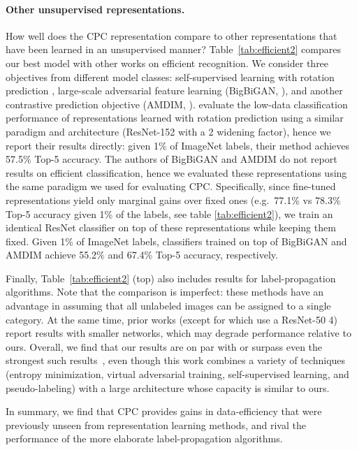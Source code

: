 \documentclass{article}
\begin{document}
\paragraph{Other unsupervised representations.} How well does the CPC representation compare to other representations that have been learned in an unsupervised manner? Table~\ref{tab:efficient2} compares our best model with other works on efficient recognition. We consider three objectives from different model classes: self-supervised learning with rotation prediction \citep{zhai2019s}, large-scale adversarial feature learning (BigBiGAN, \citet{donahue2019large}), and another contrastive prediction objective (AMDIM, \citet{bachman2019learning}). \citet{zhai2019s} evaluate the low-data classification performance of representations learned with rotation prediction using a similar paradigm and architecture (ResNet-152 with a 2 widening factor), hence we report their results directly: given 1\% of ImageNet labels, their method achieves 57.5\% Top-5 accuracy. The authors of BigBiGAN and AMDIM do not report results on efficient classification, hence we evaluated these representations using the same paradigm we used for evaluating CPC. Specifically, since fine-tuned representations yield only marginal gains over fixed ones (e.g.\ 77.1\% vs 78.3\% Top-5 accuracy given 1\% of the labels, see table \ref{tab:efficient2}), we train an identical ResNet classifier on top of these representations while keeping them fixed. Given 1\% of ImageNet labels, classifiers trained on top of BigBiGAN and AMDIM achieve 55.2\% and 67.4\% Top-5 accuracy, respectively.

Finally, Table~\ref{tab:efficient2} (top) also includes results for label-propagation algorithms. Note that the comparison is imperfect: these methods have an advantage in assuming that all unlabeled images can be assigned to a single category.  At the same time, prior works (except for \citet{zhai2019s} which use a ResNet-50 4) report results with smaller networks, which may degrade performance relative to ours. Overall, we find that our results are on par with or surpass even the strongest such results~\citep{zhai2019s}, even though this work combines a variety of techniques (entropy minimization, virtual adversarial training, self-supervised learning, and pseudo-labeling) with a large architecture whose capacity is similar to ours.

In summary, we find that CPC provides gains in data-efficiency that were previously unseen from representation learning methods, and rival the performance of the more elaborate label-propagation algorithms. 
\end{document}
